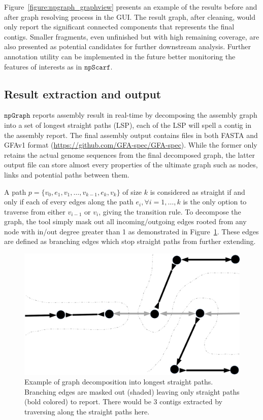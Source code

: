 \documentclass[10pt,twocolumn,twoside]{genpaper}
\newcommand{\npscarf}{$\mathtt{npScarf}$}
\newcommand{\npgraph}{$\mathtt{npGraph}$}
\begin{document}
Figure~\ref{figure:npgraph_graphview} presents an example of the results before and after graph resolving process in the GUI.
The result graph, after cleaning, would only report the significant connected components that represents the final contigs.
Smaller fragments, even unfinished but with high remaining coverage, are also presented as potential candidates for further downstream analysis.
Further annotation utility can be implemented in the future better monitoring the features of interests as in \npscarf{}.
\subsection*{Result extraction and output}
\npgraph{} reports assembly result in real-time by decomposing the assembly graph into a set of longest straight paths (LSP), each of the LSP will spell a contig in the assembly report.
The final assembly output contains files in both FASTA and GFAv1 format (\url{https://github.com/GFA-spec/GFA-spec}). While the former only retains the actual genome sequences from the final decomposed graph, the latter output file can store almost every properties of the ultimate graph such as nodes, links and potential paths between them.

A path $p=\{v_0,e_1,v_1,\ldots,v_{k-1},e_k,v_k\}$ of size $k$ is considered as straight if and only if each of every edges along the path $e_i, \forall i=1,\ldots,k$ is the only option to traverse from either $v_{i-1}$ or $v_i$, giving the transition rule.
To decompose the graph, the tool simply mask out all incoming/outgoing edges rooted from any node with in/out degree greater than 1 as demonstrated in Figure~\ref{figure:npgraph_decompose}. These edges are defined as branching edges which stop straight paths from further extending.

\begin{figure}[!hpt]
\centering
\includegraphics[width=.6\textwidth]{images/decompose.pdf}
\caption[Example of graph decomposition into longest straight paths]{Example of graph decomposition into longest straight paths. Branching edges are masked out (shaded) leaving only straight paths (bold colored) to report. There would be 3 contigs extracted by traversing along the straight paths here.}
\label{figure:npgraph_decompose}
\end{figure}
\end{document}
